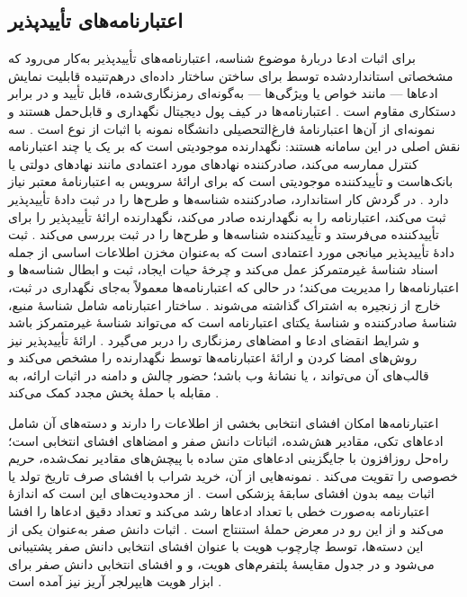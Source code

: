 \subsection{اعتبارنامه‌های تأییدپذیر }

برای اثبات ادعا دربارهٔ موضوع شناسه، اعتبارنامه‌های تأییدپذیر  به‌کار می‌رود که مشخصاتی استانداردشده توسط  برای ساختن ساختار داده‌ای درهم‌تنیده قابلیت نمایش ادعاها — مانند خواص یا ویژگی‌ها — به‌گونه‌ای رمزنگاری‌شده، قابل تأیید و در برابر دستکاری مقاوم است \cite{mazzocca2025survey}. اعتبارنامه‌ها در کیف پول دیجیتال نگهداری و قابل‌حمل هستند و نمونه‌ای از آن‌ها اعتبارنامهٔ فارغ‌التحصیلی دانشگاه نمونه با اثبات از نوع  است \cite{mazzocca2025survey}. سه نقش اصلی در این سامانه هستند: نگهدارنده  موجودیتی است که بر یک یا چند اعتبارنامه کنترل ممارسه می‌کند، صادرکننده  نهادهای مورد اعتمادی مانند نهادهای دولتی یا بانک‌هاست و تأییدکننده  موجودیتی است که برای ارائهٔ سرویس به اعتبارنامهٔ معتبر نیاز دارد \cite{mazzocca2025survey}. در گردش کار استاندارد، صادرکننده شناسه‌ها و طرح‌ها را در ثبت دادهٔ تأییدپذیر ثبت می‌کند، اعتبارنامه را به نگهدارنده صادر می‌کند، نگهدارنده ارائهٔ تأییدپذیر را برای تأییدکننده می‌فرستد و تأییدکننده شناسه‌ها و طرح‌ها را در ثبت بررسی می‌کند \cite{mazzocca2025survey}. ثبت دادهٔ تأییدپذیر  میانجی مورد اعتمادی است که به‌عنوان مخزن اطلاعات اساسی از جمله اسناد شناسهٔ غیرمتمرکز عمل می‌کند و چرخهٔ حیات ایجاد، ثبت و ابطال شناسه‌ها و اعتبارنامه‌ها را مدیریت می‌کند؛ در حالی که اعتبارنامه‌ها معمولاً به‌جای نگهداری در ثبت، خارج از زنجیره به اشتراک گذاشته می‌شوند \cite{mazzocca2025survey}. ساختار اعتبارنامه شامل شناسهٔ منبع، شناسهٔ صادرکننده و شناسهٔ یکتای اعتبارنامه است که می‌تواند شناسهٔ غیرمتمرکز باشد و شرایط انقضای ادعا و امضاهای رمزنگاری را دربر می‌گیرد \cite{mazzocca2025survey}. ارائهٔ تأییدپذیر  نیز روش‌های امضا کردن و ارائهٔ اعتبارنامه‌ها توسط نگهدارنده را مشخص می‌کند و قالب‌های آن می‌تواند ،  یا نشانهٔ وب  باشد؛ حضور چالش و دامنه در اثبات ارائه، به مقابله با حملهٔ پخش مجدد کمک می‌کند \cite{mazzocca2025survey}.

اعتبارنامه‌ها امکان افشای انتخابی بخشی از اطلاعات را دارند و دسته‌های آن شامل ادعاهای تکی، مقادیر هش‌شده، اثباتات دانش صفر و امضاهای افشای انتخابی است؛ راه‌حل روزافزون  با جایگزینی ادعاهای متن ساده با پیچش‌های مقادیر نمک‌شده، حریم خصوصی را تقویت می‌کند \cite{mazzocca2025survey}. نمونه‌هایی از آن، خرید شراب با افشای صرف تاریخ تولد یا اثبات بیمه بدون افشای سابقهٔ پزشکی است \cite{mazzocca2025survey}. از محدودیت‌های  این است که اندازهٔ اعتبارنامه به‌صورت خطی با تعداد ادعاها رشد می‌کند و تعداد دقیق ادعاها را افشا می‌کند و از این رو در معرض حملهٔ استنتاج است \cite{mazzocca2025survey}. اثبات دانش صفر  به‌عنوان یکی از این دسته‌ها، توسط چارچوب هویت  با عنوان افشای انتخابی دانش صفر پشتیبانی می‌شود و در جدول مقایسهٔ پلتفرم‌های هویت،  و  و افشای انتخابی دانش صفر برای ابزار هویت هایپرلجر آریز نیز آمده است \cite{mazzocca2025survey}.

